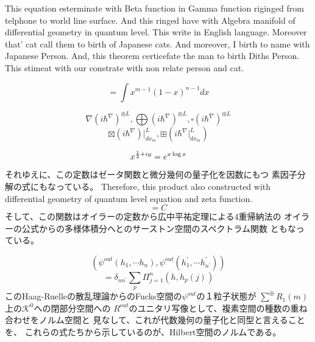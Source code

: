 \documentclass{jsarticle}
\begin{document}
     This equation esterminate with Beta function in Gamma function riginged from telphone
  to world line surface. And this ringed have with Algebra manifold of differential geometry in
  quantum level. This write in English language. Moreover that' cat call them to birth of Japanese cats.
  And moreover, I birth to name with Japanese Person. 
  And, this theorem certicefate the man to birth Diths Person.
  This stimeat with our constrate with non relate person and cat.


  $$ = \int x^{m-1}(1 - x)^{n-1} dx $$


  $$ \nabla ({i \hbar^{\nabla}})^{\oplus L}, \bigoplus ({i \hbar^{\nabla}})^{
	   \oplus L}, \square ({i \hbar^{\nabla}})^{\oplus L} $$
   $$ \boxtimes (i \hbar^{\nabla})|_{dx_m}^L, \boxplus (i \hbar^{\nabla}|_
   {dx_m}^L) $$



  $$ x^{{1 \over 2} + iy} = e^{x \log x} $$
  それゆえに、この定数はゼータ関数と微分幾何の量子化を因数にもつ
  素因子分解の式にもなっている。
  Therefore, this product also constructed with differential geometry
  of quantum level equation and zeta function.
  $$ = C $$ 
  そして、この関数はオイラーの定数から広中平祐定理による4重帰納法の
  オイラーの公式からの多様体積分へとのサーストン空間のスペクトラム関数
  ともなっている。
 
  $$ (\psi^{out}(h_1, \dotsb h_n), \psi^{out}(h^{'}_1, \dotsb h^{'}_{{n^{'}}}
  )) $$
  $$ = \delta_{n n^{'}} \sum_{p} \Pi^{n}_{j=1} (h,h_{p}(
  j)) $$
  このHaag-Ruelleの散乱理論からのFucks空間の$ \psi^{out} $の１粒子状態が
  $\sum^{\oplus}R_1(m)$上の$\mathcal{K^{0}}$への閉部分空間への
  $R^{out}$のユニタリ写像として、複素空間の種数の重ね合わせをノルム空間と
  見なして、これが代数幾何の量子化と同型と言えることを、
  これらの式たちから示しているのが、Hilbert空間のノルムである。　
\end{document}
